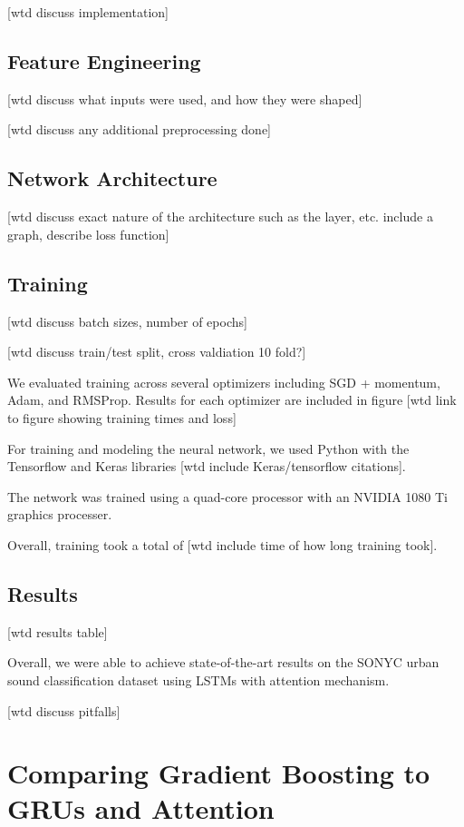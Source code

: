 [wtd discuss implementation]

\section{Feature Engineering}

[wtd discuss what inputs were used, and how they were shaped]

[wtd discuss any additional preprocessing done]

\section{Network Architecture}

[wtd discuss exact nature of the architecture such as the layer, etc. include a graph, describe loss function]

\section{Training}

[wtd discuss batch sizes, number of epochs]

[wtd discuss train/test split, cross valdiation 10 fold?]

We evaluated training across several optimizers including SGD + momentum, Adam, and RMSProp.  Results for each optimizer are included in figure [wtd link to figure showing training times and loss]

For training and modeling the neural network, we used Python with the Tensorflow and Keras libraries [wtd include Keras/tensorflow citations].

The network was trained using a quad-core processor with an NVIDIA 1080 Ti graphics processer.

Overall, training took a total of [wtd include time of how long training took].

\section{Results}

[wtd results table]

Overall, we were able to achieve state-of-the-art results on the SONYC urban sound classification dataset using LSTMs with attention mechanism.

[wtd discuss pitfalls]

\chapter{Comparing Gradient Boosting to GRUs and Attention}


